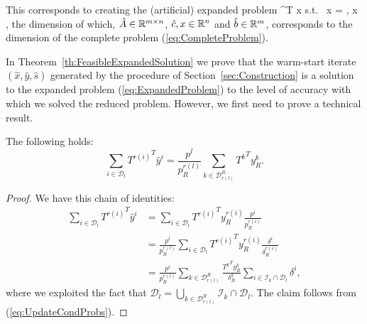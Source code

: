 This corresponds to creating the (artificial) expanded problem
\be \label{eq:ExpandedProblem}
\min\; ^T x \;\quad \mbox{s.t. }\;  x = ,
    \; x ,
\ee
the dimension of which, $\hat{A} \in \mathbb{R}^{m\times n}$, 
$\hat{c}, x \in \mathbb{R}^{n}$ and $\hat{b} \in \mathbb{R}^{m}$,
corresponds to the dimension of the complete problem 
(\ref{eq:CompleteProblem}).

In Theorem~\ref{th:FeasibleExpandedSolution} we prove that 
the warm-start iterate $(\hat{x},\hat{y},\hat{s})$
generated by the procedure of Section~\ref{sec:Construction}
is a solution to the expanded problem (\ref{eq:ExpandedProblem}) 
to the level of accuracy with which we solved the reduced problem.
However,
we first need to prove a technical result.

\begin{lemma}  \label{th:SumOfTerms}
The following holds:
\[
\sum_{i \in \mathcal{D}_{l}} {T^{r(i)}}^T \hat y^i
  = \frac{p^{l}}{p^{r(l)}_R}\sum_{k \in \mathcal{D}_{r(l)}^R}
    {T^k}^T y^k_R.
\]
\end{lemma}
%
\begin{proof}
We have this chain of identities:
\[
\begin{split}
\sum_{i \in \mathcal{D}_{l}} {T^{r(i)}}^T \hat y^i
  &= \sum_{i\in\mathcal{D}_{l}} {T^{r(i)}}^T y^{r(i)}_R\frac{p^i}{p^{r(i)}_R}\\
  &= \frac{p^{l}}{p^{r(l)}_R}\sum_{i \in \mathcal{D}_{l}} {T^{r(i)}}^T
    y^{r(i)}_R \frac{\delta^i}{\delta_R^{r(i)}}\\
  &= \frac{p^{l}}{p^{r(l)}_R}\! \sum_{k \in \mathcal{D}_{r(l)}^R} \!\!
       \frac{{T^k}^T y^k_R}{\delta_R^k}
       \sum_{i \in \mathcal{I}_k \cap \mathcal{D}_{l}}\!\!\! \delta^{i},
\end{split}
\]
where we exploited the fact that
\(
  \mathcal{D}_{l} = \bigcup_{k \in \mathcal{D}_{r(l)}^R}
     \mathcal{I}_{k} \cap \mathcal{D}_{l}.
\)
The claim follows from (\ref{eq:UpdateCondProbs}).
\end{proof}

